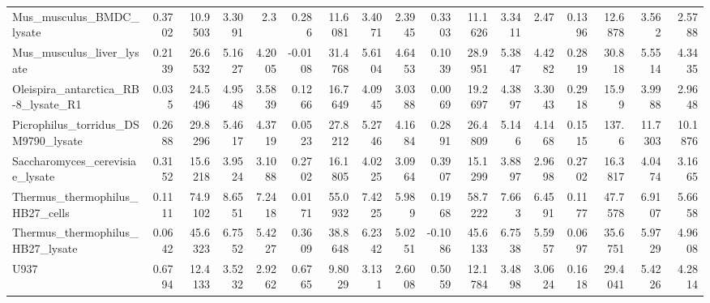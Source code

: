 \begin{tabular}{lrrrrrrrrrrrrrrrr}
 Mus\_musculus\_BMDC\_lysate                    &              0.3702   &          10.9503 &           3.3091  &          2.3     &         0.286    &     11.6081 &       3.4071 &     2.3945  &       0.3303   &   11.1626 &    3.3411  &   2.47    &         0.1396   &     12.6878 &      3.562   &     2.5788  \\
 Mus\_musculus\_liver\_lysate                   &              0.2139   &          26.6532 &           5.1627  &          4.2005  &        -0.0108   &     31.4768 &       5.6104 &     4.6453  &       0.1039   &   28.9951 &    5.3847  &   4.4282  &         0.2819   &     30.818  &      5.5514  &     4.3435  \\
 Oleispira\_antarctica\_RB-8\_lysate\_R1         &              0.035    &          24.5496 &           4.9548  &          3.5839  &         0.1266   &     16.7649 &       4.0945 &     3.0388  &       0.0069   &   19.2697 &    4.3897  &   3.3043  &         0.2918   &     15.99   &      3.9988  &     2.9648  \\
 Picrophilus\_torridus\_DSM9790\_lysate         &              0.2688   &          29.8296 &           5.4617  &          4.3719  &         0.0523   &     27.8212 &       5.2746 &     4.1684  &       0.2891   &   26.4809 &    5.146   &   4.1468  &         0.1515   &    137.6    &     11.7303  &    10.1876  \\
 Saccharomyces\_cerevisiae\_lysate             &              0.3152   &          15.6218 &           3.9524  &          3.1088  &         0.2702   &     16.1805 &       4.0225 &     3.0964  &       0.3907   &   15.1299 &    3.8897  &   2.9698  &         0.2702   &     16.3817 &      4.0474  &     3.1665  \\
 Thermus\_thermophilus\_HB27\_cells             &              0.1111   &          74.9102 &           8.6551  &          7.2418  &         0.0171   &     55.0932 &       7.4225 &     5.989   &       0.1968   &   58.7222 &    7.663   &   6.4591  &         0.1177   &     47.7578 &      6.9107  &     5.6658  \\
 Thermus\_thermophilus\_HB27\_lysate            &              0.0642   &          45.6323 &           6.7552  &          5.4227  &         0.3609   &     38.8648 &       6.2342 &     5.0251  &      -0.1086   &   45.6133 &    6.7538  &   5.5957  &         0.0697   &     35.6751 &      5.9729  &     4.9608  \\
 U937                                        &              0.6794   &          12.4133 &           3.5232  &          2.9262  &         0.6765   &      9.8029 &       3.131  &     2.6008  &       0.5059   &   12.1784 &    3.4898  &   3.0624  &         0.1618   &     29.4041 &      5.4226  &     4.2814  \\

\end{tabular}
